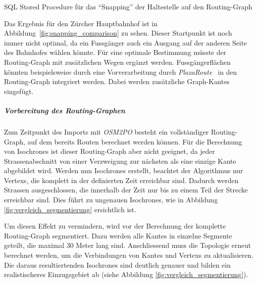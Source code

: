 \begin{listing}[ht]
    \inputminted{sql}{projectdoc/listing/nearest_neighbor.sql}
    \caption{SQL \gls{Stored Procedure} für das "`Snapping"' der \gls{Haltestelle} auf den \gls{Routing-Graph}}
    \label{listing:snap_routing_graph}
\end{listing}

Das Ergebnis für den Zürcher Hauptbahnhof ist in Abbildung~\ref{fig:snapping_comparison} zu sehen.
Dieser Startpunkt ist noch immer nicht optimal, da ein Fussgänger auch ein Ausgang auf der anderen Seite des Bahnhofes wählen könnte.
Für eine optimale Bestimmung müsste der \gls{Routing-Graph} mit zusätzlichen Wegen ergänzt werden.
Fussgängerflächen könnten beispielsweise durch eine Vorverarbeitung durch \emph{PlazaRoute}~\cite{plaza_route} in den \gls{Routing-Graph} integriert werden. Dabei werden zusätzliche Graph-\glspl{Kante} eingefügt.

\subparagraph{Vorbereitung des Routing-Graphen}
Zum Zeitpunkt des Imports mit \emph{OSM2PO} besteht ein vollständiger \gls{Routing-Graph}, auf dem bereits Routen berechnet werden können.
Für die Berechnung von \glspl{Isochrone} ist dieser \gls{Routing-Graph} aber nicht geeignet, da jeder Strassenabschnitt von einer Verzweigung zur nächsten als eine einzige \gls{Kante} abgebildet wird.
Werden nun \glspl{Isochrone} erstellt, beachtet der Algorithmus nur \glspl{Vertex}, die komplett in der definierten Zeit erreichbar sind.
Dadurch werden Strassen ausgeschlossen, die innerhalb der Zeit nur bis zu einem Teil der Strecke erreichbar sind.
Dies führt zu ungenauen \glspl{Isochrone}, wie in Abbildung \ref{fig:vergleich_segmentierung} ersichtlich ist.

Um diesen Effekt zu vermindern, wird vor der Berechnung der komplette \gls{Routing-Graph} segmentiert.
Dazu werden alle \glspl{Kante} in einzelne Segmente geteilt, die maximal 30 Meter lang sind.
Anschliessend muss die Topologie erneut berechnet werden, um die Verbindungen von \glspl{Kante} und \glspl{Vertex} zu aktualisieren.
Die daraus resultiertenden \glspl{Isochrone} sind deutlich genauer und bilden ein realistischeres Einzugsgebiet ab (siehe Abbildung \ref{fig:vergleich_segmentierung}).

